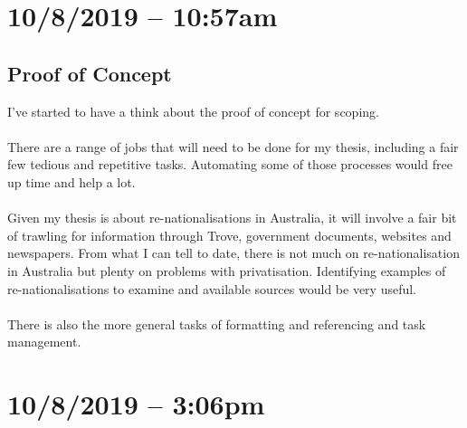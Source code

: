 \documentclass{article}
\begin{document}
\section*{10/8/2019 – 10:57am}
\subsection*{Proof of Concept}
I’ve started to have a think about the proof of concept for scoping.\\\\
There are a range of jobs that will need to be done for my thesis, including a fair few tedious and repetitive tasks. Automating some of those processes would free up time and help a lot.\\\\
Given my thesis is about re-nationalisations in Australia, it will involve a fair bit of trawling for information through Trove, government documents, websites and newspapers. From what I can tell to date, there is not much on re-nationalisation in Australia but plenty on problems with privatisation. Identifying examples of re-nationalisations to examine and available sources would be very useful.\\\\
There is also the more general tasks of formatting and referencing and task management.
 
\section*{10/8/2019 – 3:06pm}
\end{document}
